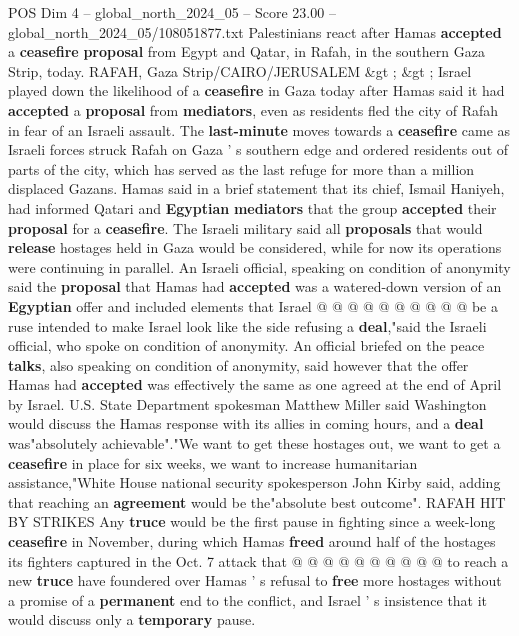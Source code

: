 \begin{textsample}{POS Dim 4 – global\_north\_2024\_05 – Score 23.00 – global\_north\_2024\_05/108051877.txt}  \label{ex:f4_pos_331}
Palestinians react after Hamas \textbf{accepted} a \textbf{ceasefire} \textbf{proposal} from Egypt and Qatar, in Rafah, in the southern Gaza Strip, today.
RAFAH, Gaza Strip/CAIRO/JERUSALEM \&gt ; \&gt ; Israel played down the likelihood of a \textbf{ceasefire} in Gaza today after Hamas said it had \textbf{accepted} a \textbf{proposal} from \textbf{mediators}, even as residents fled the city of Rafah in fear of an Israeli assault.
The \textbf{last-minute} moves towards a \textbf{ceasefire} came as Israeli forces struck Rafah on Gaza ' s southern edge and ordered residents out of parts of the city, which has served as the last refuge for more than a million displaced Gazans.
Hamas said in a brief statement that its chief, Ismail Haniyeh, had informed Qatari and \textbf{Egyptian} \textbf{mediators} that the group \textbf{accepted} their \textbf{proposal} for a \textbf{ceasefire}.
The Israeli military said all \textbf{proposals} that would \textbf{release} hostages held in Gaza would be considered, while for now its operations were continuing in parallel.
An Israeli official, speaking on condition of anonymity said the \textbf{proposal} that Hamas had \textbf{accepted} was a watered-down version of an \textbf{Egyptian} offer and included elements that Israel @ @ @ @ @ @ @ @ @ @ be a ruse intended to make Israel look like the side refusing a \textbf{deal},"said the Israeli official, who spoke on condition of anonymity.
An official briefed on the peace \textbf{talks}, also speaking on condition of anonymity, said however that the offer Hamas had \textbf{accepted} was effectively the same as one agreed at the end of April by Israel.
U.S.
State Department spokesman Matthew Miller said Washington would discuss the Hamas response with its allies in coming hours, and a \textbf{deal} was"absolutely achievable"."We want to get these hostages out, we want to get a \textbf{ceasefire} in place for six weeks, we want to increase humanitarian assistance,"White House national security spokesperson John Kirby said, adding that reaching an \textbf{agreement} would be the"absolute best outcome".
RAFAH HIT BY STRIKES Any \textbf{truce} would be the first pause in fighting since a week-long \textbf{ceasefire} in November, during which Hamas \textbf{freed} around half of the hostages its fighters captured in the Oct. 7 attack that @ @ @ @ @ @ @ @ @ @ to reach a new \textbf{truce} have foundered over Hamas ' s refusal to \textbf{free} more hostages without a promise of a \textbf{permanent} end to the conflict, and Israel ' s insistence that it would discuss only a \textbf{temporary} pause.

\end{textsample}
